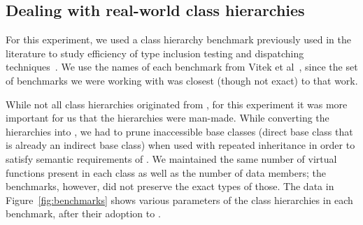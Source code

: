 \subsection{Dealing with real-world class hierarchies}
\label{sec:hierarchies}

For this experiment, we used a class hierarchy benchmark previously used in the 
literature to study efficiency of type inclusion testing and dispatching 
techniques~\cite{Vitek97,Krall97nearoptimal,PQEncoding,Ducournau08}.
We use the names of each benchmark from Vitek et al~\cite[Table 2]{Vitek97}, 
since the set of benchmarks we were working with was closest (though not exact) 
to that work.

While not all class hierarchies originated from \Cpp{}, for this experiment it 
was more important for us that the hierarchies were man-made. While converting 
the hierarchies into \Cpp{}, we had to prune inaccessible base classes (direct base  
class that is already an indirect base class) when used with repeated 
inheritance in order to satisfy semantic requirements of \Cpp{}. We maintained 
the same number of virtual functions present in each class as well as the number 
of data members; the benchmarks, however, did not preserve the exact types of those.
The data in Figure~\ref{fig:benchmarks} shows various parameters of the class 
hierarchies in each benchmark, after their adoption to \Cpp{}. 

